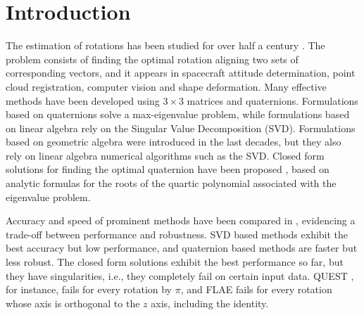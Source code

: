 \documentclass{birkjour}
\theoremstyle{definition}
\theoremstyle{remark}
\numberwithin{equation}{section}
\begin{document}
\maketitle

\section{Introduction}

The estimation of rotations has been studied for over half a century \cite{Wahba1965}. The problem consists of finding the optimal rotation aligning two sets of corresponding vectors, and it appears in spacecraft attitude determination, point cloud registration, computer vision and shape deformation. Many effective methods have been developed \cite{Arun1987, Horn1987, Mortari1996, Shuster1981, Yang2015} using $3\times3$ matrices and quaternions. Formulations based on quaternions solve a max-eigenvalue problem, while formulations based on linear algebra rely on the Singular Value Decomposition (SVD). Formulations based on geometric algebra \cite{Perwass2009, Dorst2011} were introduced in the last decades, but they also rely on linear algebra numerical algorithms such as the SVD. Closed form solutions for finding the optimal quaternion have been proposed \cite{Yang2013, Wu2017, Wu2018FA3R, Wu2018FS3R}, based on analytic formulas for the roots of the quartic polynomial associated with the eigenvalue problem.

Accuracy and speed of prominent methods have been compared in \cite{Eggert1997, Markley1999, Wu2017}, evidencing a trade-off between performance and robustness. SVD based methods exhibit the best accuracy but low performance, and quaternion based methods are faster but less robust. The closed form solutions exhibit the best performance so far, but they have singularities, i.e., they completely fail on certain input data. QUEST \cite{Shuster1981}, for instance, fails for every rotation by $\pi$, and FLAE \cite{Wu2017} fails for every rotation whose axis is orthogonal to the $z$ axis, including the identity.
\end{document}

